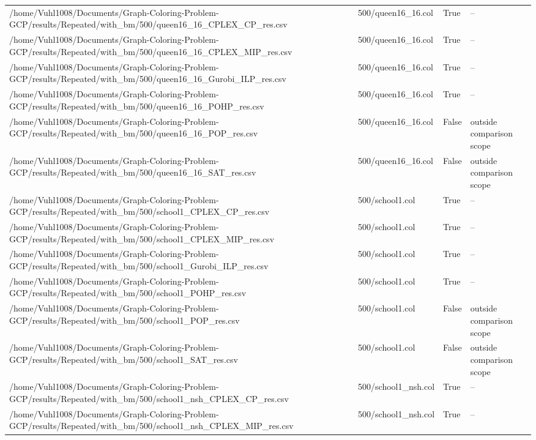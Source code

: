 \begin{table}[htbp]
\begin{tabular}{llll}
/home/Vuhl1008/Documents/Graph-Coloring-Problem-GCP/results/Repeated/with\_bm/500/queen16\_16\_CPLEX\_CP\_res.csv & 500/queen16\_16.col & True & -- \\
/home/Vuhl1008/Documents/Graph-Coloring-Problem-GCP/results/Repeated/with\_bm/500/queen16\_16\_CPLEX\_MIP\_res.csv & 500/queen16\_16.col & True & -- \\
/home/Vuhl1008/Documents/Graph-Coloring-Problem-GCP/results/Repeated/with\_bm/500/queen16\_16\_Gurobi\_ILP\_res.csv & 500/queen16\_16.col & True & -- \\
/home/Vuhl1008/Documents/Graph-Coloring-Problem-GCP/results/Repeated/with\_bm/500/queen16\_16\_POHP\_res.csv & 500/queen16\_16.col & True & -- \\
/home/Vuhl1008/Documents/Graph-Coloring-Problem-GCP/results/Repeated/with\_bm/500/queen16\_16\_POP\_res.csv & 500/queen16\_16.col & False & outside comparison scope \\
/home/Vuhl1008/Documents/Graph-Coloring-Problem-GCP/results/Repeated/with\_bm/500/queen16\_16\_SAT\_res.csv & 500/queen16\_16.col & False & outside comparison scope \\
/home/Vuhl1008/Documents/Graph-Coloring-Problem-GCP/results/Repeated/with\_bm/500/school1\_CPLEX\_CP\_res.csv & 500/school1.col & True & -- \\
/home/Vuhl1008/Documents/Graph-Coloring-Problem-GCP/results/Repeated/with\_bm/500/school1\_CPLEX\_MIP\_res.csv & 500/school1.col & True & -- \\
/home/Vuhl1008/Documents/Graph-Coloring-Problem-GCP/results/Repeated/with\_bm/500/school1\_Gurobi\_ILP\_res.csv & 500/school1.col & True & -- \\
/home/Vuhl1008/Documents/Graph-Coloring-Problem-GCP/results/Repeated/with\_bm/500/school1\_POHP\_res.csv & 500/school1.col & True & -- \\
/home/Vuhl1008/Documents/Graph-Coloring-Problem-GCP/results/Repeated/with\_bm/500/school1\_POP\_res.csv & 500/school1.col & False & outside comparison scope \\
/home/Vuhl1008/Documents/Graph-Coloring-Problem-GCP/results/Repeated/with\_bm/500/school1\_SAT\_res.csv & 500/school1.col & False & outside comparison scope \\
/home/Vuhl1008/Documents/Graph-Coloring-Problem-GCP/results/Repeated/with\_bm/500/school1\_nsh\_CPLEX\_CP\_res.csv & 500/school1\_nsh.col & True & -- \\
/home/Vuhl1008/Documents/Graph-Coloring-Problem-GCP/results/Repeated/with\_bm/500/school1\_nsh\_CPLEX\_MIP\_res.csv & 500/school1\_nsh.col & True & -- \\

\end{tabular}
\end{table}
